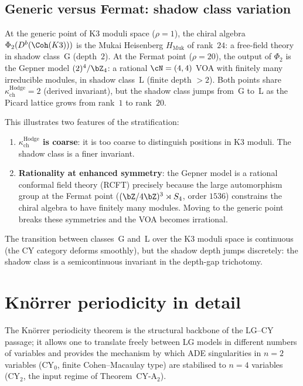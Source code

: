 \subsection{Generic versus Fermat: shadow class variation}
\label{subsec:mf-fermat-vs-generic}

\begin{remark}
\label{rem:mf-fermat-shadow-variation}
At the generic point of K3 moduli space ($\rho = 1$), the chiral algebra $\Phi_2(D^b(\Coh(K3)))$ is the Mukai Heisenberg $H_{\mathrm{Muk}}$ of rank~$24$: a free-field theory in shadow class~G (depth~$2$). At the Fermat point ($\rho = 20$), the output of $\Phi_2$ is the Gepner model $(2)^4 / \bZ_4$: a rational $\cN = (4,4)$ VOA with finitely many irreducible modules, in shadow class~L (finite depth $> 2$). Both points share $\kappa_{\mathrm{ch}}^{\mathrm{Hodge}} = 2$ (derived invariant), but the shadow class jumps from~G to~L as the Picard lattice grows from rank~$1$ to rank~$20$.

This illustrates two features of the stratification:
\begin{enumerate}
 \item \textbf{$\kappa_{\mathrm{ch}}^{\mathrm{Hodge}}$ is coarse}: it is too coarse to distinguish positions in K3 moduli. The shadow class is a finer invariant.
 \item \textbf{Rationality at enhanced symmetry}: the Gepner model is a rational conformal field theory (RCFT) precisely because the large automorphism group at the Fermat point ($(\bZ/4\bZ)^3 \rtimes S_4$, order $1536$) constrains the chiral algebra to have finitely many modules. Moving to the generic point breaks these symmetries and the VOA becomes irrational.
\end{enumerate}
The transition between classes~G and~L over the K3 moduli space is continuous (the CY category deforms smoothly), but the shadow depth jumps discretely: the shadow class is a semicontinuous invariant in the depth-gap trichotomy.
\end{remark}

\section{Kn\"orrer periodicity in detail}
\label{sec:knorrer-periodicity}

The Kn\"orrer periodicity theorem is the structural backbone of the LG--CY passage; it allows one to translate freely between LG models in different numbers of variables and provides the mechanism by which ADE singularities in $n = 2$ variables (CY$_0$, finite Cohen--Macaulay type) are stabilised to $n = 4$ variables (CY$_2$, the input regime of Theorem~CY-A$_2$).

